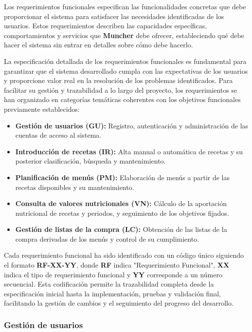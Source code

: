 Los requerimientos funcionales especifican las funcionalidades concretas que debe proporcionar el sistema para satisfacer las necesidades identificadas de los usuarios. Estos requerimientos describen las capacidades específicas, comportamientos y servicios que \textbf{Muncher} debe ofrecer, estableciendo qué debe hacer el sistema sin entrar en detalles sobre cómo debe hacerlo.

La especificación detallada de los requerimientos funcionales es fundamental para garantizar que el sistema desarrollado cumpla con las expectativas de los usuarios y proporcione valor real en la resolución de los problemas identificados. Para facilitar su gestión y trazabilidad a lo largo del proyecto, los requerimientos se han organizado en categorías temáticas coherentes con los objetivos funcionales previamente establecidos:

\begin{itemize}
	\item \textbf{Gestión de usuarios (GU):} Registro, autenticación y administración de las cuentas de acceso al sistema.
	\item \textbf{Introducción de recetas (IR):} Alta manual o automática de recetas y su posterior clasificación, búsqueda y mantenimiento.
	\item \textbf{Planificación de menús (PM):} Elaboración de menús a partir de las recetas disponibles y su mantenimiento.
	\item \textbf{Consulta de valores nutricionales (VN):} Cálculo de la aportación nutricional de recetas y periodos, y seguimiento de los objetivos fijados.
	\item \textbf{Gestión de listas de la compra (LC):} Obtención de las listas de la compra derivadas de los menús y control de su cumplimiento.
\end{itemize}

Cada requerimiento funcional ha sido identificado con un código único siguiendo el formato \textbf{RF-XX-YY}, donde \textbf{RF} indica "Requerimiento Funcional", \textbf{XX} indica el tipo de requerimiento funcional y \textbf{YY} corresponde a un número secuencial. Esta codificación permite la trazabilidad completa desde la especificación inicial hasta la implementación, pruebas y validación final, facilitando la gestión de cambios y el seguimiento del progreso del desarrollo.



\subsubsection*{Gestión de usuarios}

